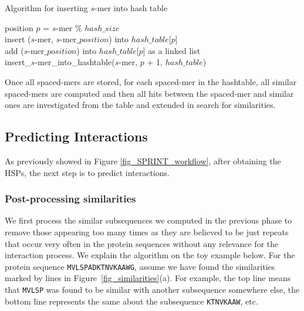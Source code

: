 \begin{algorithm}[h!]
 \SetAlgoLined 
\caption{Algorithm for inserting $s$-mer into hash table \label{algo:insert_ht}}
 \Output{}
	position $p$ = $s$-mer \% $hash\_size$ \\
	{
		insert ($s$-mer, $s$-mer$\_position$) into $hash\_table$[$p$]\\
	}
	{
		add ($s$-mer$\_position$) into $hash\_table$[$p$] as a linked list\\
	}
	{
		insert\_$s$-mer\_into\_hashtable($s$-mer, $p$ + 1, $hash\_table$)\\
	}
\end{algorithm}

Once all spaced-mers are stored, for each spaced-mer in the hashtable, all similar spaced-mers are computed and then all hits between the spaced-mer and similar ones are investigated from the table and extended in search for similarities. 

\subsection{Predicting Interactions}
As previously showed in Figure \ref{fig_SPRINT_workflow}, after obtaining the HSPs, the next step is to predict interactions.
\subsubsection{Post-processing similarities}
We first process the similar subsequences we computed in the previous phase to remove those appearing too many times as they are believed to be just repeats that occur very often in the protein sequences without any relevance for the interaction process. We explain the algorithm on the toy example below. For the protein sequence {\tt MVLSPADKTNVKAAWG}, assume we have found the similarities marked by lines in  Figure~\ref{fig_similarities}(a). For example, the top line means that {\tt MVLSP} was found to be similar with another subsequence somewhere else, the bottom line represents the same about the subsequence {\tt KTNVKAAW}, etc. 


